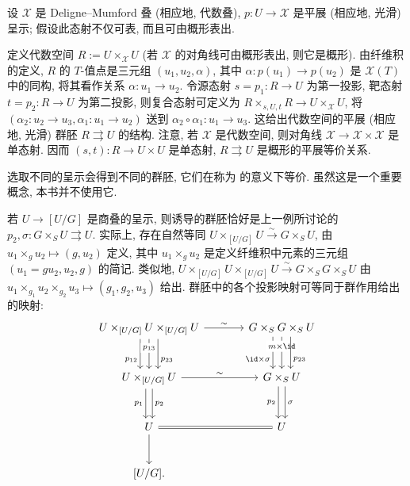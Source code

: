 \begin{example}[呈示诱导的群胚]\label{src:4.4.5}
设 $\mathcal X$ 是 Deligne--Mumford 叠 (相应地, 代数叠), $p:U\to\mathcal X$ 是平展 (相应地, 光滑) 呈示; 假设此态射不仅可表, 而且可由概形表出.

定义代数空间 $R:=U\times_{\mathcal X}U$ (若 $\mathcal X$ 的对角线可由概形表出, 则它是概形). 由纤维积的定义, $R$ 的 $T$-值点是三元组 $(u_1,u_2,\alpha)$, 其中 $\alpha:p(u_1)\to p(u_2)$ 是 $\mathcal X(T)$ 中的同构, 将其看作关系 $\alpha:u_1\to u_2$. 令源态射 $s=p_1:R\to U$ 为第一投影, 靶态射 $t=p_2:R\to U$ 为第二投影, 则复合态射可定义为 $R\times_{s,U,t}R\to U\times_{\mathcal X}U$, 将 $(\alpha_2:u_2\to u_3,\alpha_1:u_1\to u_2)$ 送到 $\alpha_2\circ\alpha_1:u_1\to u_3$. 这给出代数空间的平展 (相应地, 光滑) 群胚 $R\rightrightarrows U$ 的结构. 注意, 若 $\mathcal X$ 是代数空间, 则对角线 $\mathcal X\to\mathcal X\times\mathcal X$ 是单态射. 因而 $(s,t):R\to U\times U$ 是单态射, $R\rightrightarrows U$ 是概形的平展等价关系.

选取不同的呈示会得到不同的群胚, 它们在称为  的意义下等价. 虽然这是一个重要概念, 本书并不使用它.

若 $U\to[U/G]$ 是商叠的呈示, 则诱导的群胚恰好是上一例所讨论的 $p_2,\sigma:G\times_S U\rightrightarrows U$. 实际上, 存在自然等同 $U\times_{[U/G]}U\xrightarrow{\sim}G\times_S U$, 由 $u_1\times_g u_2\mapsto(g,u_2)$ 定义, 其中 $u_1\times_g u_2$ 是定义纤维积中元素的三元组 $(u_1=gu_2,u_2,g)$ 的简记. 类似地, $U\times_{[U/G]}U\times_{[U/G]}U\xrightarrow{\sim}G\times_S G\times_S U$ 由 $u_1\times_{g_1}u_2\times_{g_2}u_3\mapsto(g_1,g_2,u_3)$ 给出. 群胚中的各个投影映射可等同于群作用给出的映射:
\[
\begin{tikzcd}[row sep=large,column sep=large]
U\times_{[U/G]}U\times_{[U/G]}U\arrow[r,"\sim"]\arrow[d,shift right=8pt,"p_{12}"'{pos=.7}]\arrow[d,"p_{13}"{description,pos=.3}]\arrow[d,shift left=8pt,"p_{23}"{pos=.7}]&G\times_S G\times_S U\arrow[d,shift right=8pt,"\id\times\sigma"'{pos=.7}]\arrow[d,"m\times\id"{description,pos=.3}]\arrow[d,shift left=8pt,"p_{23}"{pos=.7}]\\
U\times_{[U/G]}U\arrow[r,"\sim"]\arrow[d,shift right=3pt,"p_1"']\arrow[d,shift left=3pt,"p_2"]&G\times_S U\arrow[d,shift right=3pt,"p_2"']\arrow[d,shift left=3pt,"\sigma"]\\
U\arrow[r,equal]\arrow[d]&U\\
{[U/G].}&{}
\end{tikzcd}
\]
\end{example}
